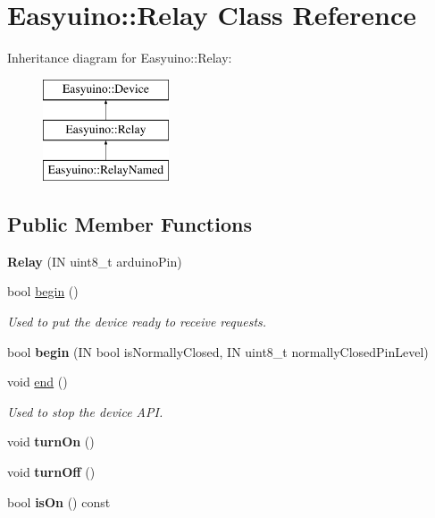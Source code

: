 \hypertarget{class_easyuino_1_1_relay}{}\section{Easyuino\+:\+:Relay Class Reference}
\label{class_easyuino_1_1_relay}
Inheritance diagram for Easyuino\+:\+:Relay\+:\begin{figure}[H]
\begin{center}
\leavevmode
\includegraphics[height=3.000000cm]{class_easyuino_1_1_relay}
\end{center}
\end{figure}
\subsection*{Public Member Functions}
\begin{DoxyCompactItemize}
\item 
\mbox{\label{class_easyuino_1_1_relay_a34a9e8461a4018e88ee49d956aca37f7}} 
{\bfseries Relay} (IN uint8\+\_\+t arduino\+Pin)
\item 
bool \hyperlink{class_easyuino_1_1_relay_a920a0fa287cacfd8c6df19d8812d4958}{begin} ()
\begin{DoxyCompactList}\small\item\em Used to put the device ready to receive requests. \end{DoxyCompactList}\item 
\mbox{\label{class_easyuino_1_1_relay_a05e66468ee1b991f394d9182b9886bf7}} 
bool {\bfseries begin} (IN bool is\+Normally\+Closed, IN uint8\+\_\+t normally\+Closed\+Pin\+Level)
\item 
void \hyperlink{class_easyuino_1_1_relay_a2b57237c996a6ffe8e900ae273bce9d4}{end} ()
\begin{DoxyCompactList}\small\item\em Used to stop the device A\+PI. \end{DoxyCompactList}\item 
\mbox{\label{class_easyuino_1_1_relay_a28b594b3ee957e062630fa2c771a966d}} 
void {\bfseries turn\+On} ()
\item 
\mbox{\label{class_easyuino_1_1_relay_a9cab51ad0aaea32752df829f3f6b8113}} 
void {\bfseries turn\+Off} ()
\item 
\mbox{\label{class_easyuino_1_1_relay_af8b4ac99e27ffac6c5f8d69d36dc01f5}} 
bool {\bfseries is\+On} () const
\end{DoxyCompactItemize}
